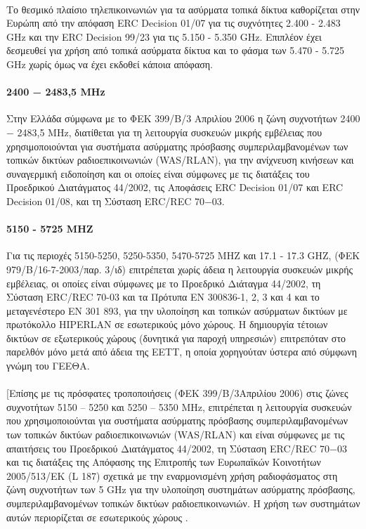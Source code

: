 \documentclass[a4paper, 12pt, twoside]{report}
\begin{document}
{{{{{{{			}
			
			\paragraph{}{Το θεσμικό πλαίσιο τηλεπικοινωνιών για τα ασύρματα τοπικά δίκτυα καθορίζεται στην Ευρώπη από την απόφαση ERC Decision 01/07 για τις συχνότητες 2.400 - 2.483 GHz και την ERC Decision 99/23 για τις 5.150 - 5.350 GHz. Επιπλέον έχει δεσμευθεί για χρήση από τοπικά ασύρματα δίκτυα και το φάσμα των 5.470 - 5.725 GHz χωρίς όμως να έχει εκδοθεί κάποια απόφαση.
			}
			\paragraph{2400 − 2483,5 MHz}{Στην Ελλάδα σύμφωνα με το ΦΕΚ 399/Β/3 Απριλίου 2006 η ζώνη συχνοτήτων 2400 − 2483,5 MHz, διατίθεται για τη λειτουργία συσκευών μικρής εμβέλειας που χρησιμοποιούνται για συστήματα ασύρματης πρόσβασης συμπεριλαμβανομένων των τοπικών δικτύων ραδιοεπικοινωνιών (WAS/RLAN), για την ανίχνευση κινήσεων και συναγερμική ειδοποίηση και οι οποίες είναι σύμφωνες με τις διατάξεις του Προεδρικού Διατάγματος 44/2002, τις Αποφάσεις  ERC Decision 01/07 και  ERC Decision 01/08, και τη Σύσταση ERC/REC 70−03.
			}
			\paragraph{5150 - 5725 ΜΗΖ}{Για τις περιοχές 5150-5250, 5250-5350, 5470-5725 ΜΗΖ και 17.1 - 17.3 GΗΖ, (ΦΕΚ 979/Β/16-7-2003/παρ. 3/ιδ) επιτρέπεται χωρίς άδεια η λειτουργία συσκευών μικρής εμβέλειας, οι οποίες είναι σύμφωνες με το Προεδρικό Διάταγμα 44/2002, τη Σύσταση ERC/REC 70-03 και τα Πρότυπα EN 300836-1, 2, 3 και 4 και το μεταγενέστερο EN 301 893, για την υλοποίηση και τοπικών ασύρματων δικτύων με πρωτόκολλο HIPERLAN σε εσωτερικούς μόνο χώρους. Η δημιουργία τέτοιων δικτύων σε εξωτερικούς χώρους (δυνητικά για παροχή υπηρεσιών) επιτρεπόταν στο παρελθόν μόνο μετά από άδεια της ΕΕΤΤ, η οποία χορηγούταν ύστερα από σύμφωνη γνώμη του ΓΕΕΘΑ. 
			}
			\paragraph{}[Επίσης με τις πρόσφατες τροποποιήσεις (ΦΕΚ 399/Β/3Απριλίου 2006) στις ζώνες συχνοτήτων 5150 – 5250 και 5250 – 5350 ΜΗz, επιτρέπεται η λειτουργία συσκευών που χρησιμοποιούνται για συστήματα ασύρματης πρόσβασης συμπεριλαμβανομένων των τοπικών δικτύων ραδιοεπικοινωνιών (WAS/RLAN) και είναι σύμφωνες με τις απαιτήσεις του Προεδρικού Διατάγματος 44/2002, τη Σύσταση ERC/REC 70−03 και τις διατάξεις της Απόφασης της Επιτροπής των Ευρωπαϊκών Κοινοτήτων 2005/513/ΕΚ (L 187) σχετικά με την εναρμονισμένη χρήση ραδιοφάσματος στη ζώνη συχνοτήτων των 5 GHz για την υλοποίηση συστημάτων ασύρματης πρόσβασης, συμπεριλαμβανομένων τοπικών δικτύων ραδιοεπικοινωνιών. Η χρήση των συστημάτων αυτών περιορίζεται σε εσωτερικούς χώρους .
			}
}}}}}
\end{document}
